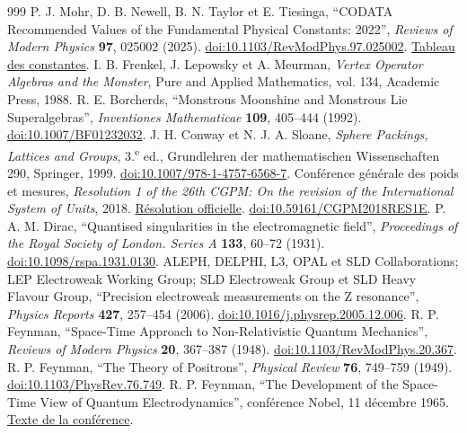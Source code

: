 \begin{thebibliography}{999}
 P. J. Mohr, D. B. Newell, B. N. Taylor et E. Tiesinga, ``CODATA Recommended Values of the Fundamental Physical Constants: 2022'', \emph{Reviews of Modern Physics} \textbf{97}, 025002 (2025). \href{https://doi.org/10.1103/RevModPhys.97.025002}{doi:10.1103/RevModPhys.97.025002}. \href{https://physics.nist.gov/cuu/Constants/Table/allascii.txt}{Tableau des constantes}.
 I. B. Frenkel, J. Lepowsky et A. Meurman, \emph{Vertex Operator Algebras and the Monster}, Pure and Applied Mathematics, vol. 134, Academic Press, 1988.
 R. E. Borcherds, ``Monstrous Moonshine and Monstrous Lie Superalgebras'', \emph{Inventiones Mathematicae} \textbf{109}, 405--444 (1992). \href{https://doi.org/10.1007/BF01232032}{doi:10.1007/BF01232032}.
 J. H. Conway et N. J. A. Sloane, \emph{Sphere Packings, Lattices and Groups}, 3.\textsuperscript{e} ed., Grundlehren der mathematischen Wissenschaften 290, Springer, 1999. \href{https://doi.org/10.1007/978-1-4757-6568-7}{doi:10.1007/978-1-4757-6568-7}.
 Conférence générale des poids et mesures, \emph{Resolution 1 of the 26th CGPM: On the revision of the International System of Units}, 2018. \href{https://www.bipm.org/en/committees/cg/cgpm/26-2018/resolution-1}{Résolution officielle}. \href{https://doi.org/10.59161/CGPM2018RES1E}{doi:10.59161/CGPM2018RES1E}.
 P. A. M. Dirac, ``Quantised singularities in the electromagnetic field'', \emph{Proceedings of the Royal Society of London. Series A} \textbf{133}, 60--72 (1931). \href{https://doi.org/10.1098/rspa.1931.0130}{doi:10.1098/rspa.1931.0130}.
 ALEPH, DELPHI, L3, OPAL et SLD Collaborations; LEP Electroweak Working Group; SLD Electroweak Group et SLD Heavy Flavour Group, ``Precision electroweak measurements on the Z resonance'', \emph{Physics Reports} \textbf{427}, 257--454 (2006). \href{https://doi.org/10.1016/j.physrep.2005.12.006}{doi:10.1016/j.physrep.2005.12.006}.
 R. P. Feynman, ``Space-Time Approach to Non-Relativistic Quantum Mechanics'', \emph{Reviews of Modern Physics} \textbf{20}, 367--387 (1948). \href{https://doi.org/10.1103/RevModPhys.20.367}{doi:10.1103/RevModPhys.20.367}.
 R. P. Feynman, ``The Theory of Positrons'', \emph{Physical Review} \textbf{76}, 749--759 (1949). \href{https://doi.org/10.1103/PhysRev.76.749}{doi:10.1103/PhysRev.76.749}.
 R. P. Feynman, ``The Development of the Space-Time View of Quantum Electrodynamics'', conférence Nobel, 11 décembre 1965. \href{https://www.nobelprize.org/prizes/physics/1965/feynman/lecture/}{Texte de la conférence}.

\end{thebibliography}
